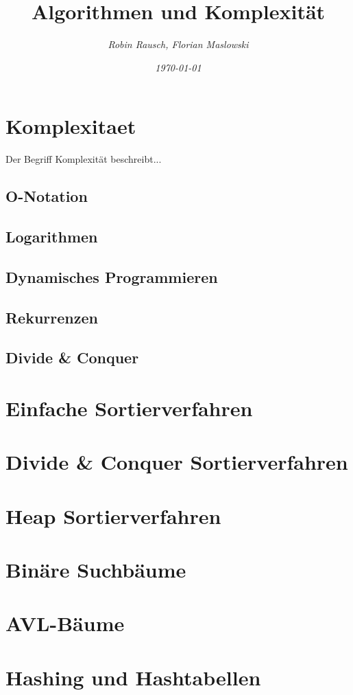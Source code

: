 \documentclass[12pt,a4paper]{article}
\author{\slshape Robin Rausch, Florian Maslowski}
\title{Algorithmen und Komplexität}
\date{\slshape \today}
\begin{document}
\maketitle
\tableofcontents
\newpage
\section{Komplexitaet}
Der Begriff Komplexität beschreibt...
\subsection{O-Notation}

\subsection{Logarithmen}

\subsection{Dynamisches Programmieren}

\subsection{Rekurrenzen}

\subsection{Divide \& Conquer}

\section{Einfache Sortierverfahren}

\section{Divide \& Conquer Sortierverfahren}

\section{Heap Sortierverfahren}

\section{Binäre Suchbäume}

\section{AVL-Bäume}

\section{Hashing und Hashtabellen}
\end{document}
